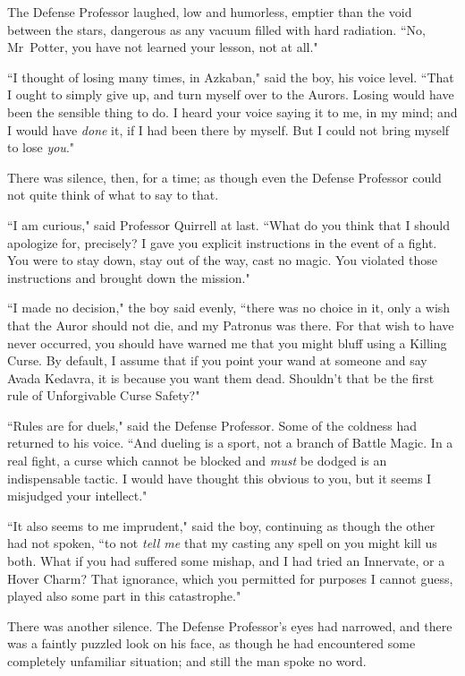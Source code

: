 The Defense Professor laughed, low and humorless, emptier than the void between the stars, dangerous as any vacuum filled with hard radiation. ``No, Mr~Potter, you have not learned your lesson, not at all."

``I thought of losing many times, in Azkaban," said the boy, his voice level. ``That I ought to simply give up, and turn myself over to the Aurors. Losing would have been the sensible thing to do. I heard your voice saying it to me, in my mind; and I would have \emph{done} it, if I had been there by myself. But I could not bring myself to lose \emph{you}."

There was silence, then, for a time; as though even the Defense Professor could not quite think of what to say to that.

``I am curious," said Professor Quirrell at last. ``What do you think that I should apologize for, precisely? I gave you explicit instructions in the event of a fight. You were to stay down, stay out of the way, cast no magic. You violated those instructions and brought down the mission."

``I made no decision," the boy said evenly, ``there was no choice in it, only a wish that the Auror should not die, and my Patronus was there. For that wish to have never occurred, you should have warned me that you might bluff using a Killing Curse. By default, I assume that if you point your wand at someone and say Avada Kedavra, it is because you want them dead. Shouldn't that be the first rule of Unforgivable Curse Safety?"

``Rules are for duels," said the Defense Professor. Some of the coldness had returned to his voice. ``And dueling is a sport, not a branch of Battle Magic. In a real fight, a curse which cannot be blocked and \emph{must} be dodged is an indispensable tactic. I would have thought this obvious to you, but it seems I misjudged your intellect."

``It also seems to me imprudent," said the boy, continuing as though the other had not spoken, ``to not \emph{tell me} that my casting any spell on you might kill us both. What if you had suffered some mishap, and I had tried an Innervate, or a Hover Charm? That ignorance, which you permitted for purposes I cannot guess, played also some part in this catastrophe."

There was another silence. The Defense Professor's eyes had narrowed, and there was a faintly puzzled look on his face, as though he had encountered some completely unfamiliar situation; and still the man spoke no word.

